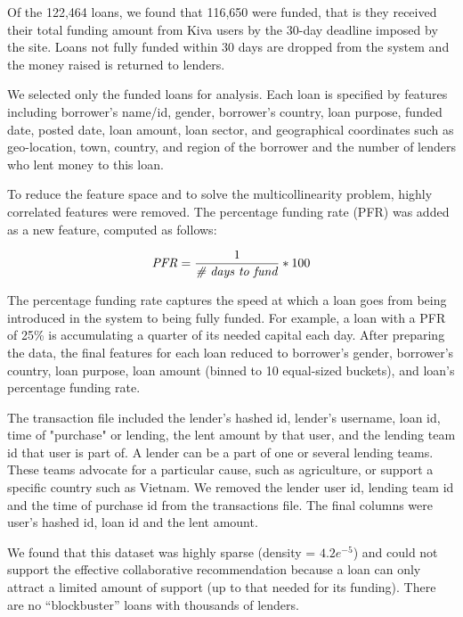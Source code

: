     Of the 122,464 loans, we found that 116,650 were funded, that is they received their total funding amount from Kiva users by the 30-day deadline imposed by the site. Loans not fully funded within 30 days are dropped from the system and the money raised is returned to lenders.
    
    We selected only the funded loans for analysis. Each loan is specified by features including borrower's name/id, gender, borrower's country, loan purpose, funded date, posted date, loan amount, loan sector, and geographical coordinates such as geo-location, town, country, and region of the borrower and the number of lenders who lent money to this loan.
    
    
    To reduce the feature space and to solve the multicollinearity problem, highly correlated features were removed. The percentage funding rate (PFR) was added as a new feature, computed as follows:
    
    \begin{equation}
     \mbox{\textit{PFR}} =  \frac{1}{\mbox{\textit{{\#} days to fund}}} * 100 
    \end{equation}
    
    The percentage funding rate captures the speed at which a loan goes from being introduced in the system to being fully funded. For example, a loan with a PFR of 25\% is accumulating a quarter of its needed capital each day. After preparing the data, the final features for each loan reduced to borrower's gender, borrower's country, loan purpose, loan amount (binned to 10 equal-sized buckets), and loan's percentage funding rate. 
    
    The transaction file included the lender's hashed id, lender's username, loan id, time of "purchase" or lending, the lent amount by that user, and the lending team id that user is part of. A lender can be a part of one or several lending teams. These teams advocate for a particular cause, such as agriculture, or support a specific country such as Vietnam. We removed the lender user id, lending team id and the time of purchase id from the transactions file. The final columns were user's hashed id, loan id and the lent amount.
    
    We found that this dataset was highly sparse (density = $4.2e^{-5}$) and could not support the effective collaborative recommendation because a loan can only attract a limited amount of support (up to that needed for its funding). There are no ``blockbuster'' loans with thousands of lenders.
    
